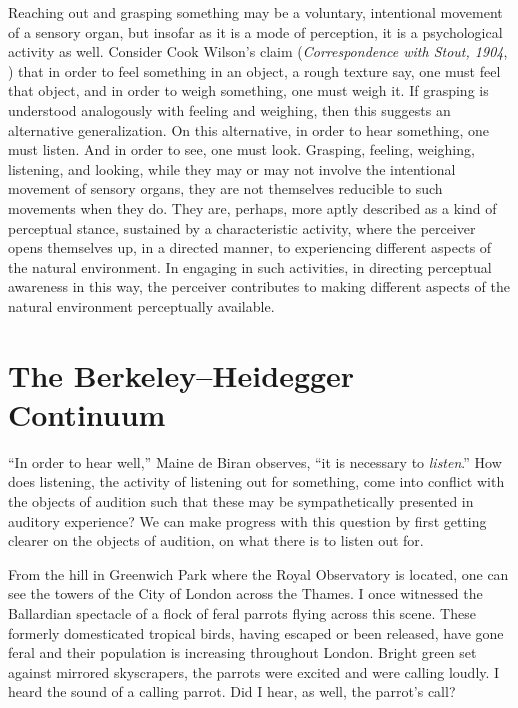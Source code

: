 Reaching out and grasping something may be a voluntary, intentional movement of a sensory organ, but insofar as it is a mode of perception, it is a psychological activity as well. Consider Cook Wilson's claim (\emph{Correspondence with Stout, 1904}, \citeyear{Cook-Wilson:1926sf}) that in order to feel something in an object, a rough texture say, one must feel that object, and in order to weigh something, one must weigh it. If grasping is understood analogously with feeling and weighing, then this suggests an alternative generalization. On this alternative, in order to hear something, one must listen. And in order to see, one must look. Grasping, feeling, weighing, listening, and looking, while they may or may not involve the intentional movement of sensory organs, they are not themselves reducible to such movements when they do. They are, perhaps, more aptly described as a kind of perceptual stance, sustained by a characteristic activity, where the perceiver opens themselves up, in a directed manner, to experiencing different aspects of the natural environment. In engaging in such activities, in directing perceptual awareness in this way, the perceiver contributes to making different aspects of the natural environment perceptually available.


\section{The Berkeley--Heidegger Continuum} %
\label{sec:the_berkeley_heidegger_continuum}

``In order to hear well,'' Maine de Biran observes, ``it is necessary to \emph{listen}.'' How does listening, the activity of listening out for something, come into conflict with the objects of audition such that these may be sympathetically presented in auditory experience? We can make progress with this question by first getting clearer on the objects of audition, on what there is to listen out for.

From the hill in Greenwich Park where the Royal Observatory is located, one can see the towers of the City of London across the Thames. I once witnessed the Ballardian spectacle of a flock of feral parrots flying across this scene. These formerly domesticated tropical birds, having escaped or been released, have gone feral and their population is increasing throughout London. Bright green set against mirrored skyscrapers, the parrots were excited and were calling loudly. I heard the sound of a calling parrot. Did I hear, as well, the parrot's call?

